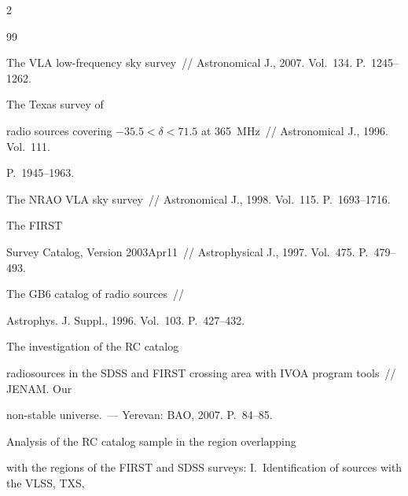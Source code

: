 \begin{multicols}{2}
{{\begin{thebibliography}{99}


The VLA low-frequency sky survey~// Astronomical J., 2007. Vol.~134. P.~1245--1262.



The Texas survey of 

radio sources covering $-35.5 < \delta < 71.5$ at 365~MHz~// Astronomical J., 1996. Vol.~111. 

P.~1945--1963. 


 The NRAO VLA sky survey~// Astronomical J., 1998. Vol.~115. P.~1693--1716. 


 The FIRST 

Survey Catalog, Version 2003Apr11~// Astrophysical J., 1997. Vol.~475. P.~479--493. 



The GB6 catalog of radio sources~// 

Astrophys. J. Suppl., 1996. Vol.~103. P.~427--432. 


 The investigation of the RC catalog 

radiosources in the SDSS and FIRST crossing area with IVOA program tools~// \mbox{JENAM}. Our 

non-stable universe.~--- Yerevan: BAO, 2007. P.~84--85.



Analysis of the RC catalog sample in the region overlapping 

with the regions of the FIRST and SDSS surveys: I.~Identification of sources with the VLSS, TXS, 


\end{thebibliography}}}
\end{multicols}
